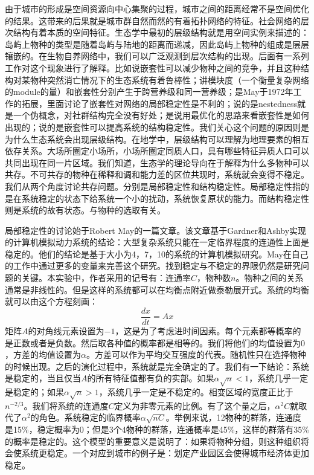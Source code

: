由于城市的形成是空间资源向中心集聚的过程，城市之间的距离经常不是空间优化的结果。这带来的后果就是城市群自然而然的有着拓扑网络的特征。社会网络的层次结构有着本质的空间特征。生态学中最初的层级结构就是用空间实例来描述的：岛屿上物种的类型是随着岛屿与陆地的距离而递减，因此岛屿上物种的组成是层层镶嵌的。在生物自养网络\cite{Bascompte9383}中，我们可以广泛观测到层次结构的出现。后面有一系列工作对这个现象进行了解释。比如\cite{bastolla2009architecture}说嵌套性可以减少物种之间的竞争，并且这种结构对某物种突然消亡情况下的生态系统有着鲁棒性；\cite{thebault2010stability}讲模块度（一个衡量复杂网络的module的量）和嵌套性分别产生于跨营养级和同一营养级；\cite{Allesina2012}是May于1972年工作的拓展，里面讨论了嵌套性对网络的局部稳定性是不利的；\cite{james2012disentangling}说的是nestedness就是一个伪概念，对社群结构完全没有好处；\cite{suweis2013emergence}是说用最优化的思路来看嵌套性是如何出现的；\cite{rohr2014structural}说的是嵌套性可以提高系统的结构稳定性。我们关心这个问题的原因则是为什么生态系统会出现层级结构。在地学中，层级结构可以理解为地理要素的相互依存关系。大场所圈定小场所，小场所圈定同质人口，具有哪些特征异质人口可以共同出现在同一片区域。我们知道，生态学的理论导向在于解释为什么多物种可以共存。不可共存的物种在稀释和调和能力差的区位共现时，系统就会变得不稳定。我们从两个角度讨论共存问题。分别是局部稳定性和结构稳定性。局部稳定性指的是在系统稳定的状态下给系统一个小的扰动，系统恢复原状的能力。而结构稳定性则是系统的故有状态。与物种的选取有关。

局部稳定性的讨论始于Robert May的一篇文章\cite{may1972will}。该文章基于Gardner和Ashby实现的计算机模拟动力系统的结论：大型复杂系统只能在一定临界程度的连通性上面是稳定的。他们的结论是基于大小为4，7，10的系统的计算机模拟研究。May在自己的工作中通过更多的变量来完善这个研究。找到稳定与不稳定的界限仍然是研究问题的关键。本实验中，作者采用的记号有：连通率\(C\)，物种数\(n\)。物种之间的关系通常是非线性的。但是这样的系统都可以在均衡点附近做泰勒展开式。系统的均衡就可以由这个方程刻画：\[\frac{dx}{dt} = Ax\]矩阵\(A\)的对角线元素设置为\(-1\)，这是为了考虑进时间因素。每个元素都等概率的是正数或者是负数。然后取各种值的概率都是相等的。我们将他们的均值设置为\(0\)，方差的均值设置为\(\alpha\)。方差可以作为平均交互强度的代表。随机性只在选择物种的时候出现。之后的演化过程中，系统就是完全确定的了。我们有一下结论：系统是稳定的，当且仅当\(A\)的所有特征值都有负的实部。如果\(\alpha\sqrt{n}<1\)，系统几乎一定是稳定的；如果\(\alpha\sqrt{n}>1\)，系统几乎一定是不稳定的。相变区域的宽度正比于\(n^{-2/3}\)。我们将系统的连通度\(C\)定义为非零元素的比例。有了这个量之后，\(\alpha^2C\)就取代了\(\alpha^2\)的角色。系统稳定的临界概率\(\alpha\sqrt{nC}\)。举例来说，12物种的群落，连通度是15\%，稳定概率为0；但是3个4物种的群落，连通概率是45\%，这样的群落有35\%的概率是稳定的。这个模型的重要意义是说明了：如果将物种分组，则这种组织将会使系统更稳定。一个对应到城市的例子是：划定产业园区会使得城市经济体更加稳定。

